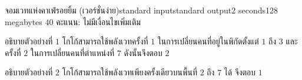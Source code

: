 \documentclass[11pt,a4paper]{article}
\begin{document}
\begin{problem}{จอมเวทแห่งคาเฟ่รอยยิ้ม (เวอร์ชั่นง่าย)}{standard input}{standard output}{2 seconds}{128 megabytes}
$40$ คะแนน: ไม่มีเงื่อนไขเพิ่มเติม

\Examples

\begin{example}
\end{example}

อธิบายตัวอย่างที่ $1$ โกโก้สามารถใช้พลังเวทครั้งที่ $1$ ในการเปลี่ยนคนที่อยู่ในพิกัดตั้งแต่ $1$ ถึง $3$ และครั้งที่ $2$ ในการเปลี่ยนคนที่ตำแหน่งที่ $7$ ดังนั้นจึงตอบ $2$

อธิบายตัวอย่างที่ $2$ โกโก้สามารถใช้พลังเวทเพียงครั้งเดียวบนพื้นที่ $2$ ถึง $7$ ได้ จึงตอบ $1$

\end{problem}
\end{document}
